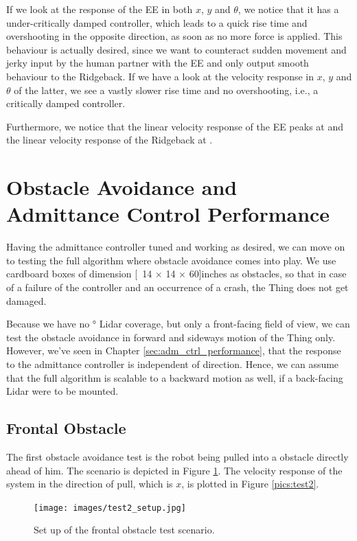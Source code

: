 If we look at the response of the EE in both $x$, $y$ and $\theta$, we notice that it has a under-critically damped controller, which leads to a quick rise time and overshooting in the opposite direction, as soon as no more force is applied. This behaviour is actually desired, since we want to counteract sudden movement and jerky input by the human partner with the EE and only output smooth behaviour to the Ridgeback. If we have a look at the velocity response in $x$, $y$ and $\theta$ of the latter, we see a vastly slower rise time and no overshooting, i.e., a critically damped controller.

Furthermore, we notice that the linear velocity response of the EE peaks at  and the linear velocity response of the Ridgeback at .

\section{Obstacle Avoidance and Admittance Control Performance}
Having the admittance controller tuned and working as desired, we can move on to testing the full algorithm where obstacle avoidance comes into play. We use cardboard boxes of dimension \unit[14 $\times$ 14 $\times$ 60]{inches} as obstacles, so that in case of a failure of the controller and an occurrence of a crash, the Thing does not get damaged.

Because we have no \unit[360]{\degree} \textsf{Lidar} coverage, but only a front-facing field of view, we can test the obstacle avoidance in forward and sideways motion of the Thing only. However, we've seen in Chapter \ref{sec:adm_ctrl_performance}, that the response to the admittance controller is independent of direction. Hence, we can assume that the full algorithm is scalable to a backward motion as well, if a back-facing \textsf{Lidar} were to be mounted.

\subsection{Frontal Obstacle}
The first obstacle avoidance test is the robot being pulled into a obstacle directly ahead of him. The scenario is depicted in Figure \ref{pics:test2_setup}. The velocity response of the system in the direction of pull, which is $x$, is plotted in Figure \ref{pics:test2}.

\begin{figure}[h]
   \centering
   \texttt{[image: images/test2\_setup.jpg]}
   \caption{Set up of the frontal obstacle test scenario.}
   \label{pics:test2_setup}
\end{figure}

